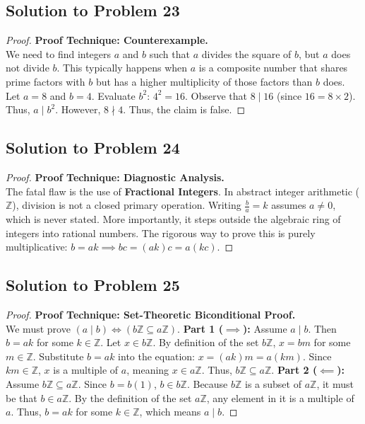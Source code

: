 \documentclass[12pt]{article}
\begin{document}
\subsection{Solution to Problem 23}
\begin{proof}
\textbf{Proof Technique: Counterexample.} \\
We need to find integers $a$ and $b$ such that $a$ divides the square of $b$, but $a$ does not divide $b$. This typically happens when $a$ is a composite number that shares prime factors with $b$ but has a higher multiplicity of those factors than $b$ does.
Let $a = 8$ and $b = 4$.
Evaluate $b^2$: $4^2 = 16$.
Observe that $8 \mid 16$ (since $16 = 8 \times 2$). Thus, $a \mid b^2$.
However, $8 \nmid 4$. Thus, the claim is false.
\end{proof}

\subsection{Solution to Problem 24}
\begin{proof}
\textbf{Proof Technique: Diagnostic Analysis.} \\
The fatal flaw is the use of \textbf{Fractional Integers}. In abstract integer arithmetic ($\mathbb{Z}$), division is not a closed primary operation. Writing $\frac{b}{a} = k$ assumes $a \neq 0$, which is never stated. More importantly, it steps outside the algebraic ring of integers into rational numbers. The rigorous way to prove this is purely multiplicative: $b = ak \implies bc = (ak)c = a(kc)$.
\end{proof}

\subsection{Solution to Problem 25}
\begin{proof}
\textbf{Proof Technique: Set-Theoretic Biconditional Proof.} \\
We must prove $(a \mid b) \iff (b\mathbb{Z} \subseteq a\mathbb{Z})$.
\textbf{Part 1 ($\implies$):} Assume $a \mid b$. Then $b = ak$ for some $k \in \mathbb{Z}$. Let $x \in b\mathbb{Z}$. By definition of the set $b\mathbb{Z}$, $x = bm$ for some $m \in \mathbb{Z}$. Substitute $b = ak$ into the equation: $x = (ak)m = a(km)$. Since $km \in \mathbb{Z}$, $x$ is a multiple of $a$, meaning $x \in a\mathbb{Z}$. Thus, $b\mathbb{Z} \subseteq a\mathbb{Z}$.
\textbf{Part 2 ($\impliedby$):} Assume $b\mathbb{Z} \subseteq a\mathbb{Z}$. Since $b = b(1)$, $b \in b\mathbb{Z}$. Because $b\mathbb{Z}$ is a subset of $a\mathbb{Z}$, it must be that $b \in a\mathbb{Z}$. By the definition of the set $a\mathbb{Z}$, any element in it is a multiple of $a$. Thus, $b = ak$ for some $k \in \mathbb{Z}$, which means $a \mid b$.
\end{proof}
\end{document}
